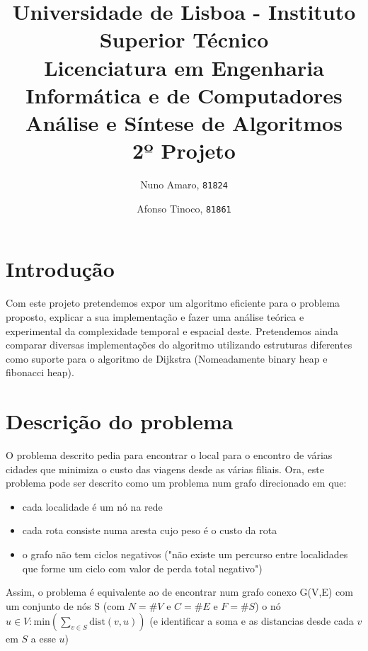 \documentclass{scrartcl}
\begin{document}

\title{
	\textnormal{
	\LARGE Universidade de Lisboa - Instituto Superior Técnico\\
	\Large Licenciatura em Engenharia Informática e de Computadores\\
	\Large Análise e Síntese de Algoritmos
\\}
	\LARGE2º Projeto
	\vspace{-1ex}
	}
\author{Nuno Amaro,
	\texttt{81824}
	\and
	Afonso Tinoco,
	\texttt{81861}
}
\date{	\vspace{-1ex}
		\vspace{-4ex}
	}
\maketitle
\section*{Introdução}
Com este projeto pretendemos expor um algoritmo eficiente para o problema proposto, explicar a sua implementação e fazer uma análise teórica e experimental da complexidade temporal e espacial deste.
Pretendemos ainda comparar diversas implementações do algoritmo utilizando estruturas diferentes como suporte para o algoritmo de Dijkstra (Nomeadamente binary heap e fibonacci heap).

\section*{Descrição do problema}
O problema descrito pedia para encontrar o local para o encontro de várias cidades que minimiza o custo das viagens desde as várias filiais.
Ora, este problema pode ser descrito como um problema num grafo direcionado em que:
\begin{itemize}
\item cada localidade é um nó na rede
\item cada rota consiste numa aresta cujo peso é o custo da rota
\item o grafo não tem ciclos negativos ("não existe um percurso entre localidades que forme um ciclo com valor de perda total negativo")
\end{itemize}
Assim, o problema é equivalente ao de encontrar num grafo conexo G(V,E) com um conjunto de nós S (com $N=\#V$ e $C=\#E$ e $F=\#S$)  o nó $u \in V: \text{min}(\sum_{v \in S} \text{dist}(v,u))$ (e identificar a soma e as distancias desde cada $v$ em $S$ a esse $u$)
\end{document}
